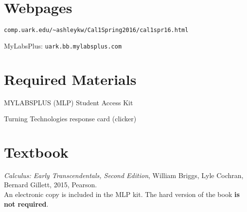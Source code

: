 \documentclass[margin,line,pifont,palatino,courier]{res}
\newenvironment{list1}{
  \begin{list}{\ding{113}}{%
      \setlength{\itemsep}{0in}
      \setlength{\parsep}{0in} \setlength{\parskip}{0in}
      \setlength{\topsep}{0in} \setlength{\partopsep}{0in}
      \setlength{\leftmargin}{0.17in}}}{\end{list}}
\begin{document}
\begin{resume}
\section{\sc Webpages}
\begin{list1}
\item \verb+comp.uark.edu/~ashleykw/Cal1Spring2016/cal1spr16.html+ 
\item MyLabsPlus:  \verb+uark.bb.mylabsplus.com+ 
\end{list1}

\section{\sc Required Materials}
\begin{list1}
\item MYLABSPLUS (MLP) Student Access Kit 
\item Turning Technologies response card (clicker)
\end{list1}

\section{\sc Textbook} \emph{Calculus: Early Transcendentals, Second Edition}, William Briggs, Lyle Cochran, Bernard Gillett, 2015, Pearson. \\
An electronic copy is included in the MLP kit.  The hard version of the book {\bf is not required}.   


\end{resume}
\end{document}

